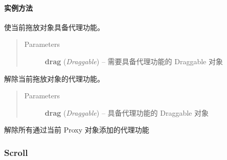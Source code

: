 \documentclass[letterpaper,10pt,english]{sphinxmanual}
\begin{document}
\paragraph{实例方法}
\label{api/component/dd/proxy:id3}

\begin{fulllineitems}
\label{api/component/dd/proxy:DD.Proxy.attach}
使当前拖放对象具备代理功能。
\begin{quote}\begin{description}
\item[{Parameters}] \leavevmode
\textbf{drag} (\emph{Draggable}) -- 需要具备代理功能的 Draggable 对象

\end{description}\end{quote}

\end{fulllineitems}



\begin{fulllineitems}
\label{api/component/dd/proxy:DD.Proxy.unAttach}
解除当前拖放对象的代理功能。
\begin{quote}\begin{description}
\item[{Parameters}] \leavevmode
\textbf{drag} (\emph{Draggable}) -- 具备代理功能的 Draggable 对象

\end{description}\end{quote}

\end{fulllineitems}



\begin{fulllineitems}
\label{api/component/dd/proxy:DD.Proxy.destroy}
解除所有通过当前 Proxy 对象添加的代理功能

\end{fulllineitems}



\subsubsection{Scroll}
\label{api/component/dd/scroll::doc}\label{api/component/dd/scroll:scroll}
\end{document}

